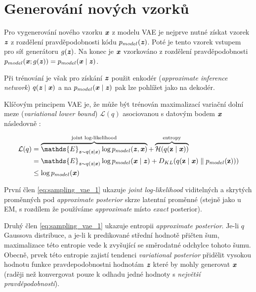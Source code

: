 \section{Generování nových vzorků}

Pro vygenerování nového vzorku $\textbf{\emph{x}}$ z modelu VAE je nejprve nutné získat vzorek $\textbf{\emph{z}}$ z rozdělení pravděpodobnosti kódu $p_{model}(\textbf{\emph{z}})$.
Poté je tento vzorek vstupem pro síť generátoru $g(\textbf{\emph{z}})$. Na konec je $\textbf{\emph{x}}$ vzorkováno z rozdělení pravděpodobnosti $p_{model}(\textbf{\emph{x}};g(\textbf{\emph{z}})) = p_{model}(\textbf{\emph{x}}\mid\textbf{\emph{z}})$. \cite{Kingma2014}

Při trénování je však pro získání $\textbf{\emph{z}}$ použit enkodér (\emph{approximate inference network}) $q(\textbf{\emph{z}}\mid\textbf{\emph{x}})$ a na $p_{model}(\textbf{\emph{x}}\mid\textbf{\emph{z}})$ pak lze pohlížet jako na dekodér. \cite{Kingma2014}

Klíčovým principem VAE je, že může být trénován maximalizací variační dolní meze (\emph{variational lower bound}) $\mathcal{L}(q)$ asociovanou s datovým bodem $\textbf{\emph{x}}$ následovně \cite{Goodfellow2016}: 

\begin{align}
    \mathcal{L}(q) &= \overbrace{ \mathds{E}_{\textbf{\emph{z}} \sim q(\textbf{\emph{z}}\mid\textbf{\emph{x}})} \log p_{model}(\textbf{\emph{z}}, \textbf{\emph{x}}) }^\text{joint log-likelihood} + \overbrace{ \mathcal{H}(q(\textbf{z} \mid \textbf{\emph{x}})) }^\text{entropy} \label{eq:sampling_vae_1} \\
    &= \mathds{E}_{\textbf{\emph{z}} \sim q(\textbf{\emph{z}}\mid\textbf{\emph{x}})} \log p_{model}(\textbf{\emph{x}}\mid\textbf{\emph{z}}) + D_{KL}(q(\textbf{z} \mid \textbf{\emph{x}})\parallel p_{model}(\textbf{z}))) \label{eq:sampling_vae_2} \\
    &\leq \log p_{model}(\textbf{\emph{x}})
\end{align}

První člen \autoref{eq:sampling_vae_1} ukazuje \emph{joint log-likelihood} viditelných a skrytých proměnných pod \emph{approximate posterior} skrze latentní proměnné (stejně jako u EM, s rozdílem že používáme \emph{approximate} místo \emph{exact} posterior).

Druhý člen \autoref{eq:sampling_vae_1} ukazuje entropii \emph{approximate posterior}.
Je-li $q$ Gaussova distribuce, a je-li k predikované střední hodnotě přičten šum, maximalizace této entropie vede k zvyšující se směrodatné odchylce tohoto šumu.
Obecně, prvek této entropie zajistí tendenci \emph{variational posterior} přidělit vysokou hodnotu funkce pravdepodobnostni hodnotám $\textbf{\emph{z}}$ které by mohly generovat $\textbf{\emph{x}}$ (raději než konvergovat pouze k odhadu jedné hodnoty s \emph{největší pravděpodobností}).

